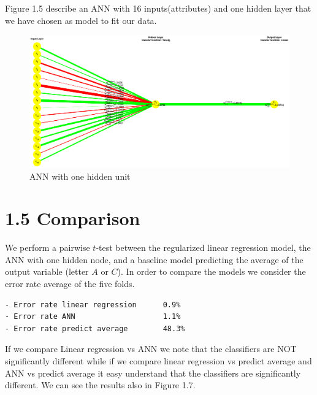 Figure 1.5 describe an ANN with 16 inputs(attributes) and one hidden layer that we have chosen as model to fit our data.
\begin{figure}[htbp]
\center
\includegraphics[width = 1.0\textwidth]{figure_p2/n1.eps}
\caption{ANN with one hidden unit}
\end{figure}


\section*{1.5 Comparison}
We perform a pairwise $t$-test between the regularized linear regression model, the ANN with one hidden node, and a baseline model predicting the average of the output variable (letter $A$ or $C$). In order to compare the models we consider the error rate average of the five folds. 
\begin{verbatim}
- Error rate linear regression      0.9%
- Error rate ANN                    1.1%
- Error rate predict average        48.3%
\end{verbatim}
If we compare Linear regression vs ANN we note that the classifiers are NOT significantly different while if we compare linear regression vs predict average and ANN vs predict average it easy understand that the classifiers are significantly different. We can see the results also in Figure 1.7.

